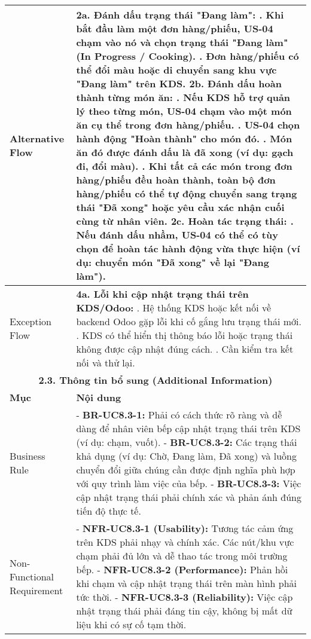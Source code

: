 \begin{longtable}{|m{4cm}|p{11cm}|}
\hline
Alternative Flow & \textbf{2a. Đánh dấu trạng thái "Đang làm":} \newline    1. Khi bắt đầu làm một đơn hàng/phiếu, US-04 chạm vào nó và chọn trạng thái "Đang làm" (In Progress / Cooking). \newline    2. Đơn hàng/phiếu có thể đổi màu hoặc di chuyển sang khu vực "Đang làm" trên KDS. \newline \textbf{2b. Đánh dấu hoàn thành từng món ăn:} \newline    1. Nếu KDS hỗ trợ quản lý theo từng món, US-04 chạm vào một món ăn cụ thể trong đơn hàng/phiếu. \newline    2. US-04 chọn hành động "Hoàn thành" cho món đó. \newline    3. Món ăn đó được đánh dấu là đã xong (ví dụ: gạch đi, đổi màu). \newline    4. Khi tất cả các món trong đơn hàng/phiếu đều hoàn thành, toàn bộ đơn hàng/phiếu có thể tự động chuyển sang trạng thái "Đã xong" hoặc yêu cầu xác nhận cuối cùng từ nhân viên. \newline \textbf{2c. Hoàn tác trạng thái:} \newline    1. Nếu đánh dấu nhầm, US-04 có thể có tùy chọn để hoàn tác hành động vừa thực hiện (ví dụ: chuyển món "Đã xong" về lại "Đang làm"). \\
\hline
Exception Flow & \textbf{4a. Lỗi khi cập nhật trạng thái trên KDS/Odoo:} \newline    1. Hệ thống KDS hoặc kết nối về backend Odoo gặp lỗi khi cố gắng lưu trạng thái mới. \newline    2. KDS có thể hiển thị thông báo lỗi hoặc trạng thái không được cập nhật đúng cách. \newline    3. Cần kiểm tra kết nối và thử lại. \\
\hline
\multicolumn{2}{|c|}{\textbf{2.3. Thông tin bổ sung (Additional Information)}} \\
\hline
\textbf{Mục} & \textbf{Nội dung} \\
\hline
Business Rule & - \textbf{BR-UC8.3-1:} Phải có cách thức rõ ràng và dễ dàng để nhân viên bếp cập nhật trạng thái trên KDS (ví dụ: chạm, vuốt). \newline - \textbf{BR-UC8.3-2:} Các trạng thái khả dụng (ví dụ: Chờ, Đang làm, Đã xong) và luồng chuyển đổi giữa chúng cần được định nghĩa phù hợp với quy trình làm việc của bếp. \newline - \textbf{BR-UC8.3-3:} Việc cập nhật trạng thái phải chính xác và phản ánh đúng tiến độ thực tế. \\
\hline
Non-Functional Requirement & - \textbf{NFR-UC8.3-1 (Usability):} Tương tác cảm ứng trên KDS phải nhạy và chính xác. Các nút/khu vực chạm phải đủ lớn và dễ thao tác trong môi trường bếp. \newline - \textbf{NFR-UC8.3-2 (Performance):} Phản hồi khi chạm và cập nhật trạng thái trên màn hình phải tức thời. \newline - \textbf{NFR-UC8.3-3 (Reliability):} Việc cập nhật trạng thái phải đáng tin cậy, không bị mất dữ liệu khi có sự cố tạm thời. \\
\hline
\end{longtable}

